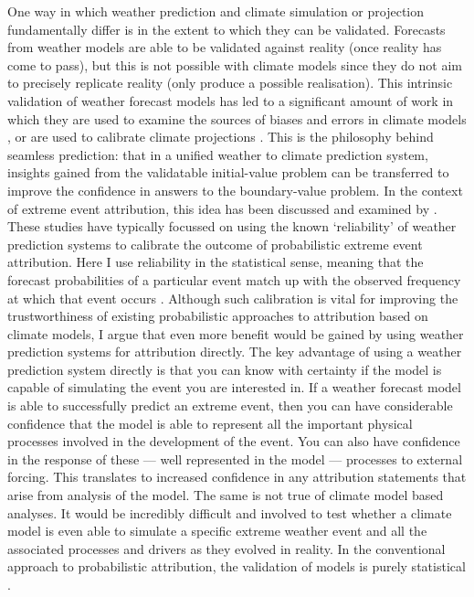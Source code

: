     One way in which weather prediction and climate simulation or projection fundamentally differ is in the extent to which they can be validated. Forecasts from weather models are able to be validated against reality (once reality has come to pass), but this is not possible with climate models since they do not aim to precisely replicate reality (only produce a possible realisation). This intrinsic validation of weather forecast models has led to a significant amount of work in which they are used to examine the sources of biases and errors in climate models \citep{williams_transpose-amip_2013}, or are used to calibrate climate projections \citep{palmer_toward_2008,matsueda_calibrating_2016}. This is the philosophy behind seamless prediction: that in a unified weather to climate prediction system, insights gained from the validatable initial-value problem can be transferred to improve the confidence in answers to the boundary-value problem. In the context of extreme event attribution, this idea has been discussed and examined by \citet{weisheimer_atmospheric_2017,palmer_simple_2018,lott_evaluating_2016,bellprat_attribution_2016,bellprat_towards_2019}. These studies have typically focussed on using the known `reliability' of weather prediction systems to calibrate the outcome of probabilistic extreme event attribution. Here I use reliability in the statistical sense, meaning that the forecast probabilities of a particular event match up with the observed frequency at which that event occurs \citep{weisheimer_reliability_2014}. Although such calibration is vital for improving the trustworthiness of existing probabilistic approaches to attribution based on climate models, I argue that even more benefit would be gained by using weather prediction systems for attribution directly. The key advantage of using a weather prediction system directly is that you can know with certainty if the model is capable of simulating the event you are interested in. If a weather forecast model is able to successfully predict an extreme event, then you can have considerable confidence that the model is able to represent all the important physical processes involved in the development of the event. You can also have confidence in the response of these --- well represented in the model --- processes to external forcing. This translates to increased confidence in any attribution statements that arise from analysis of the model. The same is not true of climate model based analyses. It would be incredibly difficult and involved to test whether a climate model is even able to simulate a specific extreme weather event and all the associated processes and drivers as they evolved in reality. In the conventional approach to probabilistic attribution, the validation of models is purely statistical \citep{philip_protocol_2020}.

